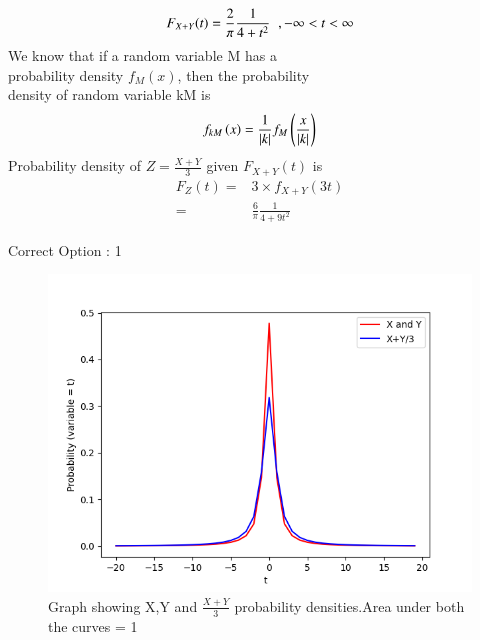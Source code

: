 \documentclass[journal,12pt,twocolumn]{IEEEtran}
\begin{document}
\begin{align}
    F_{X+Y}(t) = \frac{2}{\pi} \frac{1}{4+{t}^2}\hspace{0.2cm}, -\infty<t<\infty
\end{align}
We know that if a random variable M has a\\probability density $f_M(x)$, then the probability \\density of random variable kM is
\begin{align}
    f_{kM}\left(x\right) = \frac{1}{\vert k\vert} f_M\left(\frac{x}{\vert k\vert}\right)
\end{align}
Probability density of $Z = \displaystyle\frac{X+Y}{3}$ given $F_{X+Y}(t)$ is
\begin{align}
    F_{Z}(t) = & 3\times \displaystyle f_{X+Y}(3t) \\
    =          & \frac{6}{\pi} \frac{1}{4+9{t}^2}
\end{align}
\begin{center}
    Correct Option : 1
\end{center}
\begin{figure}[H]
    \includegraphics[width = \columnwidth]{Assignment-8.png}
    \caption{Graph showing X,Y and $\frac{X+Y}{3}$ probability densities.Area under both the curves = 1}
\end{figure}
\end{document}

